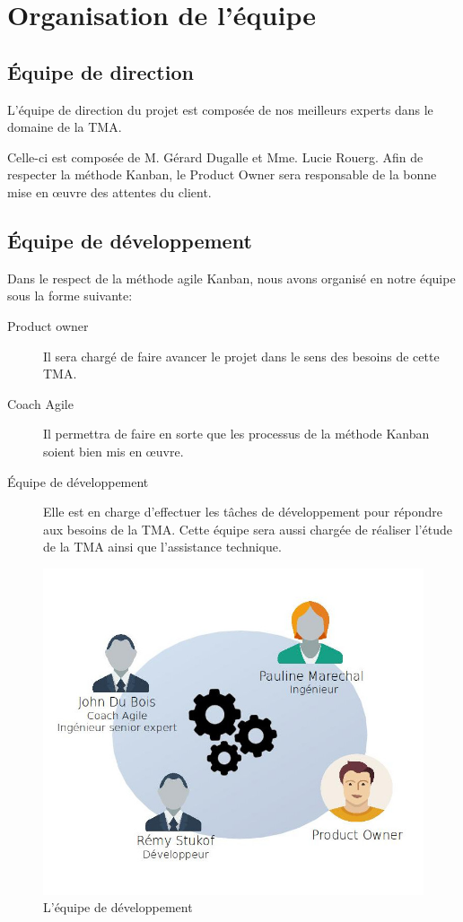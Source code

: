 \section{Organisation de l'équipe}
	\subsection{Équipe de direction}
	L’équipe de direction du projet est composée de nos meilleurs experts dans le domaine de la TMA. 

	Celle-ci est composée de M. Gérard Dugalle et Mme. Lucie Rouerg. Afin de respecter la méthode Kanban, le Product Owner sera responsable de la bonne mise en œuvre des attentes du client.
	
	\subsection{Équipe de développement}
	Dans le respect de la méthode agile Kanban, nous avons organisé en notre équipe sous la forme suivante:
	
	\begin{description}
		\item[Product owner]  Il sera chargé de faire avancer le projet dans le sens des besoins de cette TMA.
		\item[Coach Agile]  Il permettra de faire en sorte que les processus de la méthode Kanban soient bien mis en œuvre. 
		\item[Équipe de développement] Elle est en charge d’effectuer les tâches de développement pour répondre aux besoins de la TMA. Cette équipe sera aussi chargée de réaliser l’étude de la TMA ainsi que l’assistance technique. 		
	\end{description}
		
\begin{figure}
\centering
\includegraphics[width=0.7\linewidth]{images/chap2/team}
\caption{L'équipe de développement}
\label{fig:team}
\end{figure}
